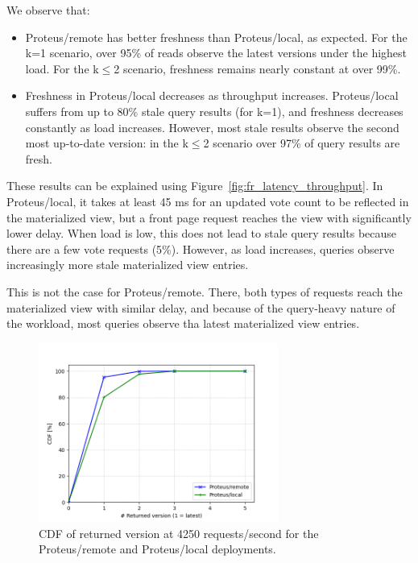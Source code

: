 We observe that:
\begin{itemize}
  \item Proteus/remote has better freshness than Proteus/local, as expected.
  For the k=1 scenario, over 95\% of reads observe the latest versions under the highest load.
  For the k$\leq$2 scenario, freshness remains nearly constant at over 99\%.
  \item Freshness in Proteus/local decreases as throughput increases.
  Proteus/local suffers from up to 80\% stale query results (for k=1), and freshness decreases constantly as load increases.
  However, most stale results observe the second most up-to-date version:
  in the k$\leq$2 scenario over 97\% of query results are fresh.
\end{itemize}

These results can be explained using Figure~\ref{fig:fr_latency_throughput}.
In Proteus/local, it takes at least 45 ms for an updated vote count to be reflected in the materialized view,
but a front page request reaches the view with significantly lower delay.
When load is low, this does not lead to stale query results because there are a few vote requests (5\%).
However, as load increases, queries observe increasingly more stale materialized view  entries.

This is not the case for Proteus/remote.
There, both types of requests reach the materialized view with similar delay,
and because of the query-heavy nature of the workload,
most queries observe tha latest materialized view entries.

\begin{figure}[H]
\centering
  \includegraphics[width=0.7\textwidth]{./figures/evaluation/readV_cdf_throughput.png}
  \caption{CDF of returned version at 4250 requests/second for the Proteus/remote and Proteus/local deployments.}
  \label{fig:readV_cdf_throughput}
\end{figure}

